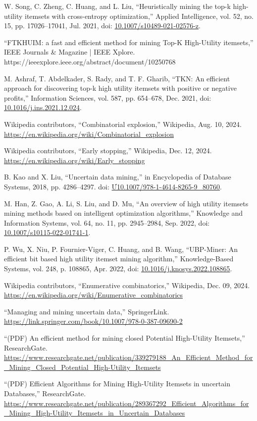 \documentclass[conference]{IEEEtran}
\begin{document}
\begin{thebibliography}{99}
W. Song, C. Zheng, C. Huang, and L. Liu, “Heuristically mining the top-k high-utility itemsets with cross-entropy optimization,” Applied Intelligence, vol. 52, no. 15, pp. 17026–17041, Jul. 2021, doi: \url{10.1007/s10489-021-02576-z}.

“FTKHUIM: a fast and efficient method for mining Top-K High-Utility itemsets,” IEEE Journals & Magazine | IEEE Xplore. https://ieeexplore.ieee.org/abstract/document/10250768

M. Ashraf, T. Abdelkader, S. Rady, and T. F. Gharib, “TKN: An efficient approach for discovering top-k high utility itemsets with positive or negative profits,” Information Sciences, vol. 587, pp. 654–678, Dec. 2021, doi: \url{10.1016/j.ins.2021.12.024}.

Wikipedia contributors, “Combinatorial explosion,” Wikipedia, Aug. 10, 2024. \url{https://en.wikipedia.org/wiki/Combinatorial_explosion}

Wikipedia contributors, “Early stopping,” Wikipedia, Dec. 12, 2024. 
\url{https://en.wikipedia.org/wiki/Early_stopping}

B. Kao and X. Liu, “Uncertain data mining,” in Encyclopedia of Database Systems, 2018, pp. 4286–4297. doi: \url{Ư10.1007/978-1-4614-8265-9_80760}.

M. Han, Z. Gao, A. Li, S. Liu, and D. Mu, “An overview of high utility itemsets mining methods based on intelligent optimization algorithms,” Knowledge and Information Systems, vol. 64, no. 11, pp. 2945–2984, Sep. 2022, doi: \url{10.1007/s10115-022-01741-1}.

P. Wu, X. Niu, P. Fournier-Viger, C. Huang, and B. Wang, “UBP-Miner: An efficient bit based high utility itemset mining algorithm,” Knowledge-Based Systems, vol. 248, p. 108865, Apr. 2022, doi: \url{10.1016/j.knosys.2022.108865}.

Wikipedia contributors, “Enumerative combinatorics,” Wikipedia, Dec. 09, 2024. \url{https://en.wikipedia.org/wiki/Enumerative_combinatorics}

“Managing and mining uncertain data,” SpringerLink. \url{https://link.springer.com/book/10.1007/978-0-387-09690-2}

“(PDF) An efficient method for mining closed Potential High-Utility Itemsets,” ResearchGate. \url{https://www.researchgate.net/publication/339279188_An_Efficient_Method_for_Mining_Closed_Potential_High-Utility_Itemsets}

“(PDF) Efficient Algorithms for Mining High-Utility Itemsets in uncertain Databases,” ResearchGate. \url{https://www.researchgate.net/publication/289367292_Efficient_Algorithms_for_Mining_High-Utility_Itemsets_in_Uncertain_Databases}

\end{thebibliography}
\end{document}
